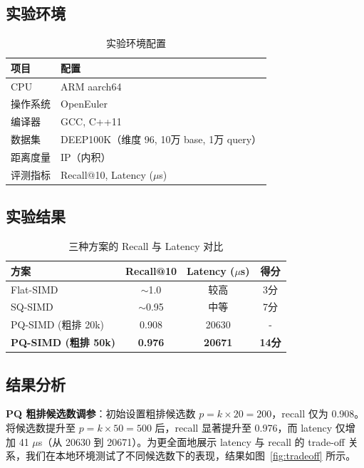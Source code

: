 \documentclass[a4paper]{article}
\begin{document}
\subsection{实验环境}

\begin{table}[!htbp]
  \centering
  \begin{tabular}{ll}
  \toprule
  项目 & 配置 \\
  \midrule
  CPU & ARM aarch64 \\
  操作系统 & OpenEuler \\
  编译器 & GCC, C++11 \\
  数据集 & DEEP100K（维度 96, 10万 base, 1万 query） \\
  距离度量 & IP（内积） \\
  评测指标 & Recall@10, Latency ($\mu$s) \\
  \bottomrule
  \end{tabular}
  \caption{实验环境配置}
\end{table}

\subsection{实验结果}

\begin{table}[!htbp]
  \centering
  \begin{tabular}{lccc}
  \toprule
  方案 & Recall@10 & Latency ($\mu$s) & 得分 \\
  \midrule
  Flat-SIMD & $\sim$1.0 & 较高 & 3分 \\
  SQ-SIMD & $\sim$0.95 & 中等 & 7分 \\
  PQ-SIMD (粗排 20k) & 0.908 & 20630 & - \\
  \textbf{PQ-SIMD (粗排 50k)} & \textbf{0.976} & \textbf{20671} & \textbf{14分} \\
  \bottomrule
  \end{tabular}
  \caption{三种方案的 Recall 与 Latency 对比}
\end{table}

\subsection{结果分析}

\textbf{PQ 粗排候选数调参}：初始设置粗排候选数 $p = k \times 20 = 200$，recall 仅为 0.908。将候选数提升至 $p = k \times 50 = 500$ 后，recall 显著提升至 0.976，而 latency 仅增加 41 $\mu$s（从 20630 到 20671）。为更全面地展示 latency 与 recall 的 trade-off 关系，我们在本地环境测试了不同候选数下的表现，结果如图~\ref{fig:tradeoff} 所示。
\end{document}
